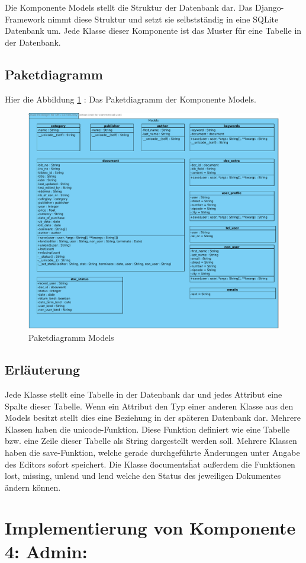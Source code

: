Die Komponente Models stellt die Struktur der Datenbank dar. Das
Django-Framework nimmt diese Struktur und setzt sie selbstständig in eine SQLite Datenbank
um. Jede Klasse dieser Komponente ist das Muster für eine Tabelle in der
Datenbank.

\subsection{Paketdiagramm}
Hier die Abbildung \ref{fig:PDmodels} : Das Paketdiagramm der Komponente Models.
\begin{figure}[!htb]
\includegraphics[width=0.72\linewidth]{bilder/Paketdiagramm_models.pdf}
\caption{Paketdiagramm Models}
\label{fig:PDmodels}
\end{figure}
\subsection{Erl\"auterung}
Jede Klasse stellt eine Tabelle in der Datenbank dar und jedes Attribut eine
Spalte dieser Tabelle. Wenn ein Attribut den Typ einer anderen Klasse aus den
Models besitzt stellt dies eine Beziehung in der späteren Datenbank dar.
Mehrere Klassen haben die unicode-Funktion. Diese Funktion definiert wie eine
Tabelle bzw. eine Zeile dieser Tabelle als String dargestellt werden soll.
Mehrere Klassen haben die save-Funktion, welche gerade durchgeführte Änderungen
unter Angabe des Editors sofort speichert. Die Klasse \"documents\" hat außerdem
die Funktionen lost, missing, unlend und lend welche den Status des jeweiligen
Dokumentes ändern können.

\section{Implementierung von Komponente
         4: Admin:}

